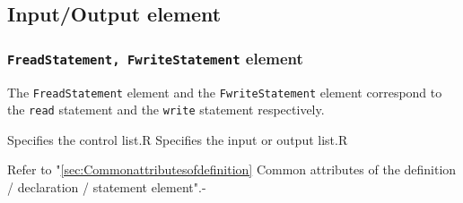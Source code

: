 \subsection{Input/Output element}

\subsubsection{ {\tt FreadStatement, FwriteStatement} element}

The {\tt FreadStatement} element and the {\tt FwriteStatement} element correspond to the {\tt read} statement and the {\tt write} statement respectively.


\begin{XcodeMLChildElements}
{Specifies the control list.}{R}
{Specifies the input or output list.}{R}
\end{XcodeMLChildElements}

\begin{XcodeMLAttributes}
{Refer to "\ref{sec:Commonattributesofdefinition} Common attributes of the definition / declaration / statement element".}{-}
\end{XcodeMLAttributes}

